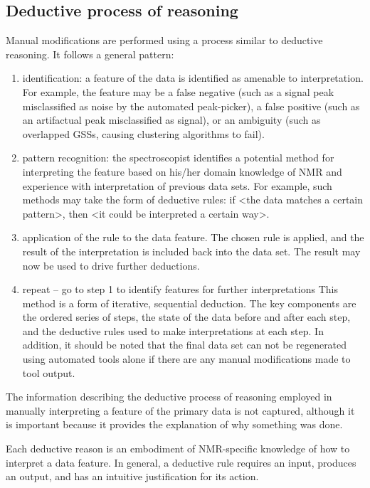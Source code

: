 \subsection{Deductive process of reasoning}
Manual modifications are performed using a process similar to deductive 
reasoning.  It follows a general pattern:
\begin{enumerate}
  \item identification: a feature of the data is identified as amenable to 
    interpretation.  For example, the feature may be a false negative (such as 
    a signal peak misclassified as noise by the automated peak-picker), a false 
    positive (such as an artifactual peak misclassified as signal), or an 
    ambiguity (such as overlapped GSSs, causing clustering algorithms to fail).
  \item pattern recognition: the spectroscopist identifies a potential method 
    for interpreting the feature based on his/her domain knowledge of NMR and 
    experience with interpretation of previous data sets.  For example, such 
    methods may take the form of deductive rules:  if <the data matches a 
    certain pattern>, then <it could be interpreted a certain way>. 
  \item application of the rule to the data feature.  The chosen rule is 
    applied, and the result of the interpretation is included back into the 
    data set.  The result may now be used to drive further deductions.
  \item repeat -- go to step 1 to identify features for further interpretations
    This method is a form of iterative, sequential deduction.  The key components 
    are the ordered series of steps, the state of the data before and after each 
    step, and the deductive rules used to make interpretations at each step.  
    In addition, it should be noted that the final data set can not be 
    regenerated using automated tools alone if there are any manual 
    modifications made to tool output.
\end{enumerate}

The information describing the deductive process of reasoning employed in 
manually interpreting a feature of the primary data is not captured, although
it is important because it provides the explanation 
of why something was done.

Each deductive reason is an embodiment of NMR-specific knowledge of how to 
interpret a data feature.  In general, a deductive rule requires an input, 
produces an output, and has an intuitive justification for its action.


